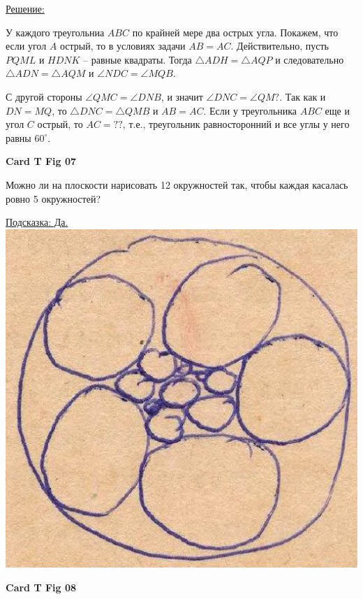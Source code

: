 \documentclass[12pt,a4paper]{article}
\begin{document}
\underline{Решение:}

У каждого треугольниа $ABC$ по крайней мере два острых угла. Покажем, что если угол $A$ острый, то в условиях задачи $AB=AC$. Действительно, пусть $PQML$ и $HDNK$ -- равные квадраты. Тогда $\triangle ADH = \triangle AQP$ и следовательно $\triangle ADN = \triangle AQM$ и $\angle NDC=\angle MQB$.

С другой стороны $\angle QMC = \angle DNB$, и значит $\angle DNC = \angle QM?$. Так как и $DN=MQ$, то  $\triangle DNC = \triangle QMB$ и $AB=AC$. Если у треугольника $ABC$ еще и угол $C$ острый, то $AC=??$, т.е., треугольник равносторонний и все углы у него равны $60^{\circ}$.

\bigskip
{}
\noindent\textbf{Card T Fig 07}
\medskip
{}

\noindent 	
\begin{minipage}{6cm}
	Можно ли на плоскости нарисовать 12 окружностей так, чтобы каждая касалась ровно 5 окружностей?
\end{minipage} \quad
\begin{minipage}{6cm}
	\underline{Подсказка: Да.}	
	\includegraphics[width=\textwidth]{Card_T_Fig7_1.eps}
\end{minipage}


\bigskip
{}
	\noindent\textbf{Card T Fig 08}
\medskip
{}
\end{document}
